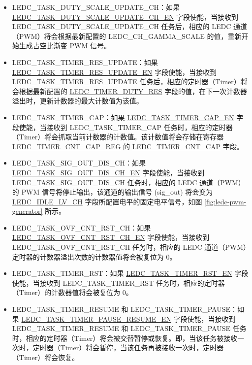 \documentclass[main\_\_CN.tex]{subfiles}
\begin{document}
\begin{itemize}
\item LEDC\_TASK\_DUTY\_SCALE\_UPDATE\_CH：如果 \hyperref[fielddesc:LEDCTASKDUTYSCALEUPDATECHNEN]{LEDC\_TASK\_DUTY\_SCALE\_UPDATE\_CH\_EN} 字段使能，当接收到 LEDC\_TASK\_DUTY\_SCALE\_UPDATE\_CH 任务后，相应的 LEDC 通道（PWM）将会根据最新配置的 LEDC\_CH\_GAMMA\_SCALE 的值，重新开始生成占空比渐变 PWM 信号。
\item LEDC\_TASK\_TIMER\_RES\_UPDATE：如果 \hyperref[fielddesc:LEDCTASKTIMERNRESUPDATEEN]{LEDC\_TASK\_TIMER\_RES\_UPDATE\_EN} 字段使能，当接收到 LEDC\_TASK\_TIMER\_RES\_UPDATE 任务后，相应的定时器（Timer）将会根据最新配置的 \hyperref[fielddesc:LEDCTIMERNDUTYRES]{LEDC\_TIMER\_DUTY\_RES} 字段的值，在下一次计数器溢出时，更新计数器的最大计数值为该值。
\item LEDC\_TASK\_TIMER\_CAP：如果 \hyperref[fielddesc:LEDCTASKTIMERNCAPEN]{LEDC\_TASK\_TIMER\_CAP\_EN} 字段使能，当接收到 LEDC\_TASK\_TIMER\_CAP 任务时，相应的定时器（Timer）将会抓取当前计数器的计数值。该计数值将会存储在寄存器 \hyperref[regdesc:LEDCTIMERNCNTCAPREG]{LEDC\_TIMER\_CNT\_CAP\_REG} 的 \hyperref[fielddesc:LEDCTIMERNCNTCAP]{LEDC\_TIMER\_CNT\_CAP} 字段。
\item LEDC\_TASK\_SIG\_OUT\_DIS\_CH：如果 \hyperref[fielddesc:LEDCTASKSIGOUTDISCHNEN]{LEDC\_TASK\_SIG\_OUT\_DIS\_CH\_EN} 字段使能，当接收到 LEDC\_TASK\_SIG\_OUT\_DIS\_CH 任务时，相应的 LEDC 通道（PWM）的 PWM 信号将停止输出，该通道的输出信号 (sig\_out) 将会变为 \hyperref[fielddesc:LEDCIDLELVCHN]{LEDC\_IDLE\_LV\_CH} 字段所配置电平的固定电平信号，如图 \ref{fig:ledc-pwm-generator} 所示。
\item LEDC\_TASK\_OVF\_CNT\_RST\_CH：如果 \hyperref[fielddesc:LEDCTASKOVFCNTRSTCHNEN]{LEDC\_TASK\_OVF\_CNT\_RST\_CH\_EN} 字段使能，当接收到 LEDC\_TASK\_OVF\_CNT\_RST\_CH 任务时，相应的 LEDC 通道（PWM）定时器的计数器溢出次数的计数器值将会被复位为 0。
\item LEDC\_TASK\_TIMER\_RST：如果 \hyperref[fielddesc:LEDCTASKTIMERNRSTEN]{LEDC\_TASK\_TIMER\_RST\_EN} 字段使能，当接收到 LEDC\_TASK\_TIMER\_RST 任务时，相应的定时器（Timer）的计数器值将会被复位为 0。
\item LEDC\_TASK\_TIMER\_RESUME 和 LEDC\_TASK\_TIMER\_PAUSE：如果 \hyperref[fielddesc:LEDCTASKTIMERNPAUSERESUMEEN]{LEDC\_TASK\_TIMER\_PAUSE\_RESUME\_EN} 字段使能，当接收到 LEDC\_TASK\_TIMER\_RESUME 和 LEDC\_TASK\_TIMER\_PAUSE 任务时，相应的定时器（Timer）将会被交替暂停或恢复。即，当该任务被接收一次时，定时器（Timer）将会暂停，当该任务再被接收一次时，定时器（Timer）将会恢复。

\end{itemize}
\end{document}
